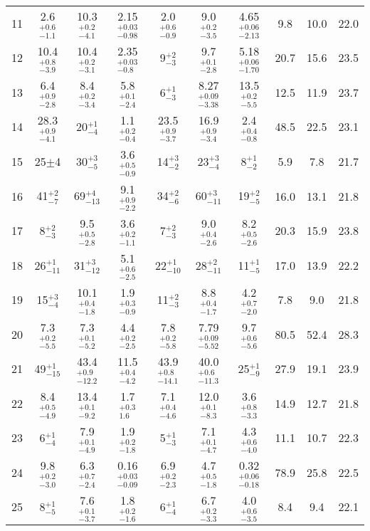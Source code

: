 \documentclass[iop,revtex4]{emulateapj}
\newcommand\M{\rule{0pt}{2.3ex}}
\begin{document}
\begin{table}
\begin{minipage}{\linewidth}
\begin{adjustwidth}{-0.9in}{-0.9in}
\begin{threeparttable}
\begin{tabular}{cccccccccc}
\M 11&2.6$^{+0.6}_{-1.1}$&10.3$^{+0.2}_{-4.1}$&2.15$^{+0.03}_{-0.98}$&2.0$^{+0.6}_{-0.9}$&9.0$^{+0.2}_{-3.5}$&4.65$^{+0.06}_{-2.13}$&9.8&10.0&22.0\\
\M 12&10.4$^{+0.8}_{-3.9}$&10.4$^{+0.2}_{-3.1}$&2.35$^{+0.03}_{-0.8}$&9$^{+2}_{-3}$&9.7$^{+0.1}_{-2.8}$&5.18$^{+0.06}_{-1.70}$&20.7&15.6&23.5\\
\M 13&6.4$^{+0.9}_{-2.8}$&8.4$^{+0.2}_{-3.4}$&5.8$^{+0.1}_{-2.4}$&6$^{+1}_{-3}$&8.27$^{+0.09}_{-3.38}$&13.5$^{+0.2}_{-5.5}$&12.5&11.9&23.7\\
\M 14&28.3$^{+0.9}_{-4.1}$&20$^{+1}_{-4}$&1.1$^{+0.2}_{-0.4}$&23.5$^{+0.9}_{-3.7}$&16.9$^{+0.9}_{-3.4}$&2.4$^{+0.4}_{-0.8}$&48.5&22.5&23.1\\
\M 15&25$\pm$4&30$^{+3}_{-5}$&3.6$^{+0.5}_{-0.9}$&14$^{+3}_{-2}$&23$^{+3}_{-4}$&8$^{+1}_{-2}$&5.9&7.8&21.7\\
\M 16&41$^{+2}_{-7}$&69$^{+4}_{-13}$&9.1$^{+0.9}_{-2.2}$&34$^{+2}_{-6}$&60$^{+3}_{-11}$&19$^{+2}_{-5}$&16.0&13.1&21.8\\
\M 17&8$^{+2}_{-3}$&9.5$^{+0.5}_{-2.8}$&3.6$^{+0.2}_{-1.1}$&7$^{+2}_{-3}$&9.0$^{+0.4}_{-2.6}$&8.2$^{+0.5}_{-2.6}$&20.3&15.9&23.8\\
\M 18&26$^{+1}_{-11}$&31$^{+3}_{-12}$&5.1$^{+0.6}_{-2.5}$&22$^{+1}_{-10}$&28$^{+2}_{-11}$&11$^{+1}_{-5}$&17.0&13.9&22.2\\
\M 19&15$^{+3}_{-4}$&10.1$^{+0.4}_{-1.8}$&1.9$^{+0.3}_{-0.9}$&11$^{+2}_{-3}$&8.8$^{+0.4}_{-1.7}$&4.2$^{+0.7}_{-2.0}$&7.8&9.0&21.8\\
\M 20&7.3$^{+0.2}_{-5.5}$&7.3$^{+0.1}_{-5.2}$&4.4$^{+0.2}_{-2.5}$&7.8$^{+0.2}_{-5.8}$&7.79$^{+0.09}_{-5.52}$&9.7$^{+0.6}_{-5.6}$&80.5&52.4&28.3\\
\M 21&49$^{+1}_{-15}$&43.4$^{+0.9}_{-12.2}$&11.5$^{+0.4}_{-4.2}$&43.9$^{+0.8}_{-14.1}$&40.0$^{+0.6}_{-11.3}$&25$^{+1}_{-9}$&27.9&19.1&23.9\\
\M 22&8.4$^{+0.5}_{-4.9}$&13.4$^{+0.1}_{-9.2}$&1.7$^{+0.3}_{1.6}$&7.1$^{+0.4}_{-4.6}$&12.0$^{+0.1}_{-8.3}$&3.6$^{+0.8}_{-3.3}$&14.9&12.7&21.8\\
\M 23&6$^{+1}_{-4}$&7.9$^{+0.1}_{-4.9}$&1.9$^{+0.2}_{-1.8}$&5$^{+1}_{-3}$&7.1$^{+0.1}_{-4.7}$&4.3$^{+0.6}_{-4.0}$&11.1&10.7&22.3\\
\M 24&9.8$^{+0.2}_{-3.0}$&6.3$^{+0.7}_{-2.4}$&0.16$^{+0.03}_{-0.09}$&6.9$^{+0.2}_{-2.3}$&4.7$^{+0.5}_{-1.8}$&0.32$^{+0.06}_{-0.18}$&78.9&25.8&22.5\\
\M 25&8$^{+1}_{-5}$&7.6$^{+0.1}_{-3.7}$&1.8$^{+0.2}_{-1.6}$&6$^{+1}_{-4}$&6.7$^{+0.2}_{-3.3}$&4.0$^{+0.6}_{-3.5}$&8.4&9.4&22.1\\

\end{tabular}
\end{threeparttable}
\end{adjustwidth}
\end{minipage}
\end{table}
\end{document}
